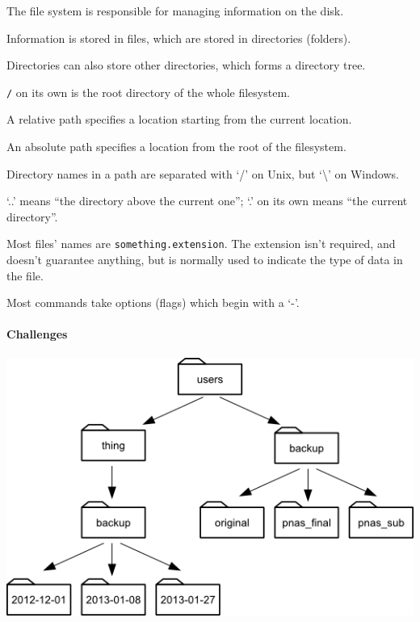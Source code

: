 \documentclass{book}
\begin{document}
\begin{swcitemize}
\item
  The file system is responsible for managing information on the disk.
\item
  Information is stored in files, which are stored in directories
  (folders).
\item
  Directories can also store other directories, which forms a directory
  tree.
\item
  \texttt{/} on its own is the root directory of the whole filesystem.
\item
  A relative path specifies a location starting from the current
  location.
\item
  An absolute path specifies a location from the root of the filesystem.
\item
  Directory names in a path are separated with `/' on Unix, but
  `\textbackslash{}' on Windows.
\item
  `..' means ``the directory above the current one''; `.' on its own
  means ``the current directory''.
\item
  Most files' names are \texttt{something.extension}. The extension
  isn't required, and doesn't guarantee anything, but is normally used
  to indicate the type of data in the file.
\item
  Most commands take options (flags) which begin with a `-'.
\end{swcitemize}

\mbox{}\paragraph{Challenges}

\includegraphics{novice/shell/img/filesystem-challenge.png}
\end{document}
